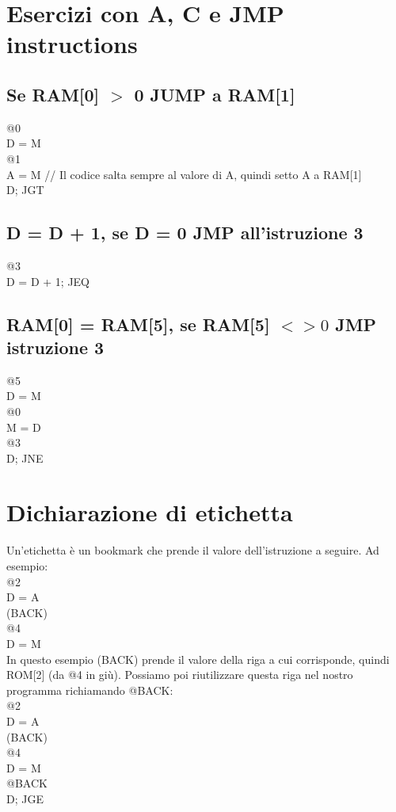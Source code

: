 \documentclass[12pt]{article}
\begin{document}
\section{Esercizi con A, C e JMP instructions}
\subsection{Se RAM[0] $ > $ 0 JUMP a RAM[1]}
@0 \\
D = M \\
@1 \\
A = M // Il codice salta sempre al valore di A, quindi setto A a RAM[1] \\
D; JGT
\subsection{D = D + 1, se D = 0 JMP all'istruzione 3}
@3 \\
D = D + 1; JEQ
\subsection{RAM[0] = RAM[5], se RAM[5] $<> 0$ JMP istruzione 3}
@5 \\
D = M \\
@0 \\
M = D \\
@3 \\
D; JNE 
\pagebreak

\section{Dichiarazione di etichetta}
Un'etichetta è un bookmark che prende il valore dell'istruzione a seguire. Ad esempio:\\
@2 \\
D = A \\
(BACK) \\
@4 \\
D = M \\
In questo esempio (BACK) prende il valore della riga a cui corrisponde, quindi ROM[2] (da @4 in giù). Possiamo poi riutilizzare questa riga nel nostro programma richiamando @BACK: \\
@2 \\
D = A \\
(BACK) \\
@4 \\
D = M \\
@BACK \\
D; JGE 
\end{document}
